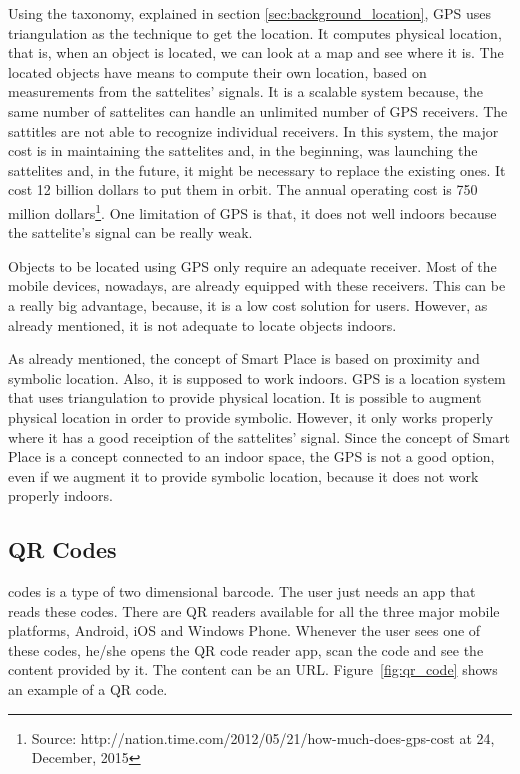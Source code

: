 Using the taxonomy, explained in section \ref{sec:background_location}, \gls{GPS} uses triangulation as the technique to get the location.
It computes physical location, that is, when an object is located, we can look at a map and see where it is.
The located objects have means to compute their own location, based on measurements from the sattelites' signals.
It is a scalable system because, the same number of sattelites can handle an unlimited number of \gls{GPS} receivers.
The sattitles are not able to recognize individual receivers.
In this system, the major cost is in maintaining the sattelites and, in the beginning, was launching the sattelites and, in the future, it might be necessary to replace the existing ones.
It cost 12 billion dollars to put them in orbit. The annual operating cost is 750 million dollars\footnote{Source: http://nation.time.com/2012/05/21/how-much-does-gps-cost at 24, December, 2015}.
One limitation of \gls{GPS} is that, it does not well indoors because the sattelite's signal can be really weak.

Objects to be located using \gls{GPS} only require an adequate receiver. Most of the mobile devices, nowadays, are already equipped with these receivers.
This can be a really big advantage, because, it is a low cost solution for users.
However, as already mentioned, it is not adequate to locate objects indoors.

As already mentioned, the concept of Smart Place is based on proximity and symbolic location.
Also, it is supposed to work indoors.
\gls{GPS} is a location system that uses triangulation to provide physical location.
It is possible to augment physical location in order to provide symbolic.
However, it only works properly where it has a good receiption of the sattelites' signal.
Since the concept of Smart Place is a concept connected to an indoor space, the \gls{GPS} is not a good option, even if we augment it to provide symbolic location, because it does not work properly indoors.

\subsection{QR Codes}
\label{sub:background_qr_codes}
 codes is a type of two dimensional barcode.
The user just needs an app that reads these codes.
There are \gls{QR} readers available for all the three major mobile platforms, Android, iOS and Windows Phone.
Whenever the user sees one of these codes, he/she opens the \gls{QR} code reader app, scan the code and see the content provided by it.
The content can be an \gls{URL}.
Figure~\ref{fig:qr_code} shows an example of a \gls{QR} code.

